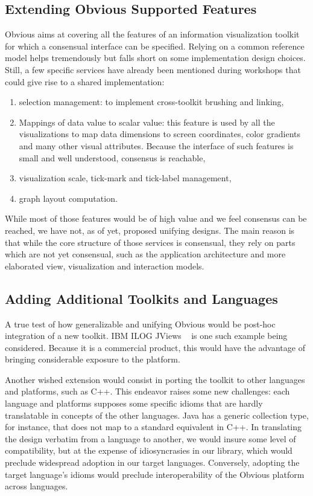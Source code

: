 
\subsection{Extending Obvious Supported Features}

Obvious aims at covering all the features of an information
visualization toolkit for which a consensual interface can be
specified.  Relying on a common reference model helps tremendously but
falls short on some implementation design choices.  Still, a few
specific services have already been mentioned during workshops that
could give rise to a shared implementation:

\begin{enumerate}
\item selection management: to implement cross-toolkit brushing and
  linking,
\item Mappings of data value to scalar value: this feature is used by
  all the visualizations to map data dimensions to screen coordinates,
  color gradients and many other visual attributes. Because the
  interface of such features is small and well understood, consensus
  is reachable,
\item visualization scale, tick-mark and tick-label management,
\item graph layout computation.
\end{enumerate}

While most of those features would be of high value and we feel
consensus can be reached, we have not, as of yet, proposed unifying
designs.  The main reason is that while the core structure of those
services is consensual, they rely on parts which are not yet
consensual, such as the application architecture and more elaborated
view, visualization and interaction models.

\subsection{Adding Additional Toolkits and Languages}

A true test of how generalizable and unifying Obvious would be
post-hoc integration of a new toolkit. IBM ILOG JViews ~\cite{JViews} is
one such example being considered. Because it is a commercial product, this would 
have the advantage of bringing considerable exposure to the platform. 

Another wished extension would consist in porting the toolkit to other
languages and platforms, such as C++. This endeavor raises some new
challenges: each language and platforms supposes some specific idioms
that are hardly translatable in concepts of the other languages. Java
has a generic collection type, for instance, that does not map to a
standard equivalent in C++. In translating the design verbatim from a
language to another, we would insure some level of compatibility, but
at the expense of idiosyncrasies in our library, which would preclude
widespread adoption in our target languages. Conversely, adopting the
target language's idioms would preclude interoperability of the
Obvious platform across languages.


